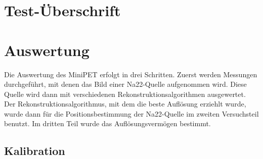 \section{Test-Überschrift}
\section{Auswertung}
Die Auswertung des MiniPET erfolgt in drei Schritten.
Zuerst werden Messungen durchgeführt, mit denen das Bild einer Na22-Quelle aufgenommen wird. Diese Quelle wird dann mit verschiedenen Rekonstruktionsalgorithmen ausgewertet. Der Rekonstruktionsalgorithmus, mit dem die beste Auflösung erziehlt wurde, wurde dann für die Positionsbestimmung der Na22-Quelle im zweiten Versuchsteil benutzt.
Im dritten Teil wurde das Auflösungsvermögen bestimmt.
\subsection{Kalibration}

